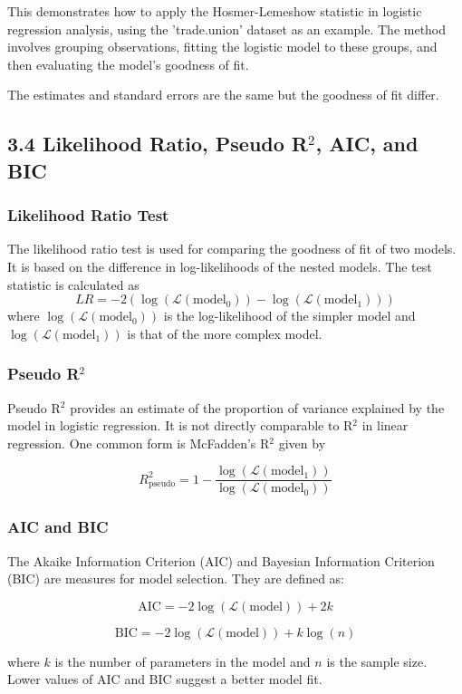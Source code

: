 \documentclass[11pt]{article}
\begin{document}
This demonstrates how to apply the Hosmer-Lemeshow statistic in logistic regression analysis, using the 'trade.union' dataset as an example. The method involves grouping observations, fitting the logistic model to these groups, and then evaluating the model's goodness of fit.

The estimates and standard errors are the same but the goodness of fit differ.

\subsection{3.4 Likelihood Ratio, Pseudo R\(^2\), AIC, and BIC}

\subsubsection{Likelihood Ratio Test}
The likelihood ratio test is used for comparing the goodness of fit of two models. It is based on the difference in log-likelihoods of the nested models. The test statistic is calculated as
\[
LR = -2(\log(\mathcal{L}(\text{model}_0)) - \log(\mathcal{L}(\text{model}_1)))
\]
where \(\log(\mathcal{L}(\text{model}_0))\) is the log-likelihood of the simpler model and \(\log(\mathcal{L}(\text{model}_1))\) is that of the more complex model.

\subsubsection{Pseudo R\(^2\)}
Pseudo R\(^2\) provides an estimate of the proportion of variance explained by the model in logistic regression. It is not directly comparable to R\(^2\) in linear regression. One common form is McFadden's R\(^2\) given by

\[ R^2_{\text{pseudo}} = 1 - \frac{\log(\mathcal{L}(\text{model}_1))}{\log(\mathcal{L}(\text{model}_0))} \]

\subsubsection{AIC and BIC}
The Akaike Information Criterion (AIC) and Bayesian Information Criterion (BIC) are measures for model selection. They are defined as:

\[ \text{AIC} = -2 \log(\mathcal{L}(\text{model})) + 2k \]

\[ \text{BIC} = -2 \log(\mathcal{L}(\text{model})) + k \log(n) \]

where \(k\) is the number of parameters in the model and \(n\) is the sample size. Lower values of AIC and BIC suggest a better model fit.
\end{document}
